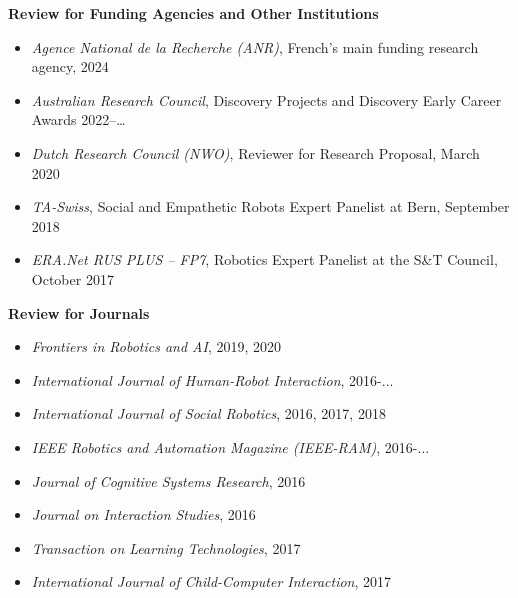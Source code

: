 \textbf{Review for Funding Agencies and Other Institutions}
\begin{itemize}
    \item[$\circ$] \emph{Agence National de la Recherche (ANR)}, French's main funding research agency, 2024
    \item[$\circ$] \emph{Australian Research Council}, Discovery Projects and Discovery Early Career Awards 2022--\ldots
    \item[$\circ$] \emph{Dutch Research Council (NWO)}, Reviewer for Research Proposal, March 2020
    \item[$\circ$] \emph{TA-Swiss}, Social and Empathetic Robots Expert Panelist at Bern, September 2018
    \item[$\circ$] \emph{ERA.Net RUS PLUS -- FP7}, Robotics Expert Panelist at the S\&T Council, October 2017
\end{itemize}

\textbf{Review for Journals}
\begin{itemize}
    \item[$\diamond$] \emph{Frontiers in Robotics and AI}, 2019, 2020
    \item[$\diamond$] \emph{International Journal of Human-Robot Interaction}, 2016-...
    \item[$\diamond$] \emph{International Journal of Social Robotics}, 2016, 2017, 2018
    \item[$\diamond$] \emph{IEEE Robotics and Automation Magazine (IEEE-RAM)}, 2016-...
    \item[$\diamond$] \emph{Journal of Cognitive Systems Research}, 2016
    \item[$\diamond$] \emph{Journal on Interaction Studies}, 2016
    \item[$\diamond$] \emph{Transaction on Learning Technologies}, 2017
    \item[$\diamond$] \emph{International Journal of Child-Computer Interaction}, 2017
\end{itemize}

